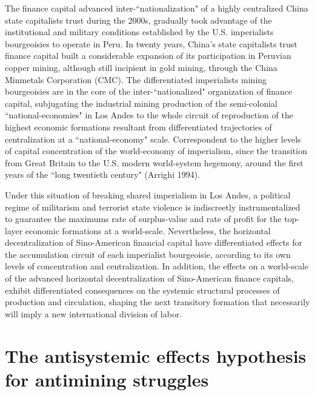 \documentclass[]{interact}
\theoremstyle{plain}%
\theoremstyle{definition}
\theoremstyle{remark}
\begin{document}
The finance capital advanced inter-“nationalization" of a highly centralized China state capitalists trust during the 2000s, gradually took advantage of the institutional and military conditions established by the U.S. imperialists bourgeoisies to operate in Peru. In twenty years, China's state capitalists trust finance capital built a considerable expansion of its participation in Peruvian copper mining, although still incipient in gold mining, through the China Minmetals Corporation (CMC). The differentiated imperialists mining bourgeoisies are in the core of the inter-“nationalized" organization of finance capital, subjugating the industrial mining production of the semi-colonial “national-economies" in Los Andes to the whole circuit of reproduction of the highest economic formations resultant from differentiated trajectories of centralization at a “national-economy" scale. Correspondent to the higher levels of capital concentration of the world-economy of imperialism, since the transition from Great Britain to the U.S. modern world-system hegemony, around the first years of the “long twentieth century" (Arrighi 1994).

Under this situation of breaking shared imperialism in Los Andes, a political regime of militarism and terrorist state violence is indiscreetly instrumentalized to guarantee the maximums rate of surplus-value and rate of profit for the top-layer economic formations at a world-scale. Nevertheless, the horizontal decentralization of Sino-American financial capital have differentiated effects for the accumulation circuit of each imperialist bourgeoisie, according to its own levels of concentration and centralization. In addition, the effects on a world-scale of the advanced horizontal decentralization of Sino-American finance capitals, exhibit differentiated consequences on the systemic structural processes of production and circulation, shaping the next transitory formation that necessarily will imply a new international division of labor.

\section{The antisystemic effects hypothesis for antimining struggles}
\end{document}
